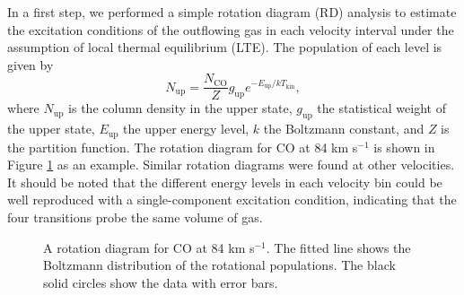 In a first step, we performed a simple rotation diagram (RD) analysis \citep{1999ApJ...517..209G} to estimate the excitation conditions of the outflowing gas in each velocity interval under the assumption of local thermal equilibrium (LTE). The population of each level is given by 
\begin{equation}
N_{\mathrm{up}} = \frac{N_\mathrm{CO}}{Z} g_\mathrm{up} e^{-E_\mathrm{up}/kT_\mathrm{kin}},
\end{equation}
where $N_\mathrm{up}$ is the column density in the upper state, $g_\mathrm{up}$ the statistical weight of the upper state, $E_\mathrm{up}$ the upper energy level, $k$ the Boltzmann constant, and $Z$ is the partition function.
The rotation diagram for CO at 84 km s$^{-1}$ is shown in Figure \ref{fig3} as an example. Similar rotation diagrams were found at other velocities. It should be noted that the different energy levels in each velocity bin could be well reproduced with a single-component excitation condition, indicating that the four transitions probe the same volume of gas.  

\begin{figure}[tbp]
\caption{A rotation diagram for CO at 84 km s$^{-1}$.  The fitted line shows the Boltzmann distribution of the rotational populations. The black solid circles show the data with error bars. \label{fig3}}
\end{figure}

